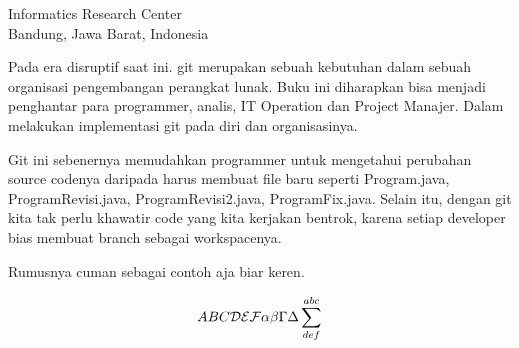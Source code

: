 

{Informatics Research Center\\
Bandung, Jawa Barat, Indonesia}

Pada era disruptif  
saat ini. git merupakan sebuah kebutuhan dalam sebuah organisasi pengembangan perangkat lunak.
Buku ini diharapkan bisa menjadi penghantar para programmer, analis, IT Operation dan Project Manajer.
Dalam melakukan implementasi git pada diri dan organisasinya.

Git ini sebenernya memudahkan programmer untuk mengetahui perubahan source codenya daripada harus membuat file baru seperti Program.java, ProgramRevisi.java,  ProgramRevisi2.java, ProgramFix.java. Selain itu, dengan git kita tak perlu khawatir code yang kita kerjakan bentrok, karena setiap developer bias membuat branch sebagai workspacenya.

Rumusnya cuman sebagai contoh aja biar keren\cite{awangga2018sampeu}.


\begin{equation}
ABC {\cal DEF} \alpha\beta\Gamma\Delta\sum^{abc}_{def}
\end{equation}
